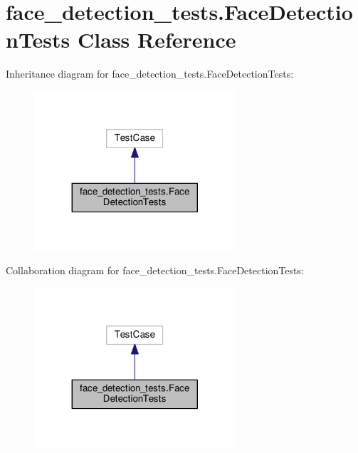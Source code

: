 \hypertarget{classface__detection__tests_1_1FaceDetectionTests}{\section{face\-\_\-detection\-\_\-tests.\-Face\-Detection\-Tests Class Reference}
\label{classface__detection__tests_1_1FaceDetectionTests}
}


Inheritance diagram for face\-\_\-detection\-\_\-tests.\-Face\-Detection\-Tests\-:
\nopagebreak
\begin{figure}[H]
\begin{center}
\leavevmode
\includegraphics[width=212pt]{classface__detection__tests_1_1FaceDetectionTests__inherit__graph}
\end{center}
\end{figure}


Collaboration diagram for face\-\_\-detection\-\_\-tests.\-Face\-Detection\-Tests\-:
\nopagebreak
\begin{figure}[H]
\begin{center}
\leavevmode
\includegraphics[width=212pt]{classface__detection__tests_1_1FaceDetectionTests__coll__graph}
\end{center}
\end{figure}
